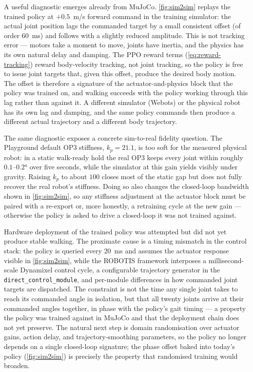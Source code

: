 A useful diagnostic emerges already from MuJoCo. \autoref{fig:sim2sim} replays
the trained policy at $+0.5$~m/s forward command in the training simulator: the
actual joint position lags the commanded target by a small consistent offset (of
order $60$~ms) and follows with a slightly reduced amplitude. This is not
tracking error — motors take a moment to move, joints have inertia, and the
physics has its own natural delay and damping. The PPO reward terms
(\autoref{eq:reward-tracking}) reward body-velocity tracking, not joint
tracking, so the policy is free to issue joint targets that, given this offset,
produce the desired body motion. The offset is therefore a signature of the
actuator-and-physics block that the policy was trained on, and walking succeeds
with the policy working through this lag rather than against it. A different
simulator (Webots) or the physical robot has its own lag and damping, and the
same policy commands then produce a different actual trajectory and a different
body trajectory.


The same diagnostic exposes a concrete sim-to-real fidelity question. The
Playground default OP3 stiffness, $k_p = 21.1$, is too soft for the measured
physical robot: in a static walk-ready hold the real OP3 keeps every joint
within roughly $0.1$--$0.2°$ over five seconds, while the simulator at this gain
yields visibly under gravity. Raising $k_p$ to about $100$ closes most of the
static gap but does not fully recover the real robot's stiffness. Doing so also
changes the closed-loop bandwidth shown in \autoref{fig:sim2sim}, so any
stiffness adjustment at the actuator block must be paired with a re-export or,
more honestly, a retraining cycle at the new gain — otherwise the policy is
asked to drive a closed-loop it was not trained against.

Hardware deployment of the trained policy was attempted but did not yet produce stable walking. The proximate cause is a timing mismatch in the control stack: the policy is queried every $20$~ms and assumes the actuator response visible in \autoref{fig:sim2sim}, while the ROBOTIS framework interposes a millisecond-scale Dynamixel control cycle, a configurable trajectory generator in the \texttt{direct\_control\_module}, and per-module differences in how commanded joint targets are dispatched. The constraint is not the time any single joint takes to reach its commanded angle in isolation, but that all twenty joints arrive at their commanded angles together, in phase with the policy's gait timing — a property the policy was trained against in MuJoCo and that the deployment chain does not yet preserve. The natural next step is domain randomisation over actuator gains, action delay, and trajectory-smoothing parameters, so the policy no longer depends on a single closed-loop signature; the phase offset baked into today's policy (\autoref{fig:sim2sim}) is precisely the property that randomised training would broaden.


